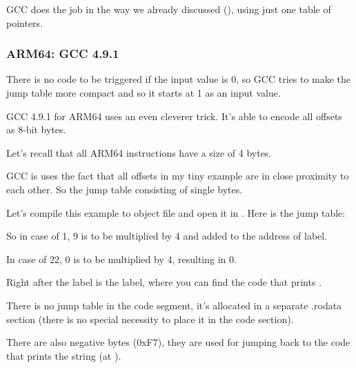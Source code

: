 GCC does the job in the way we already discussed (), using just one table of pointers.

\subsubsection{ARM64: \Optimizing GCC 4.9.1}

There is no code to be triggered if the input value is 0, so GCC tries to make the jump table more compact
and so it starts at 1 as an input value.

GCC 4.9.1 for ARM64 uses an even cleverer trick.
It's able to encode all offsets as 8-bit bytes.

Let's recall that all ARM64 instructions have a size of 4 bytes.

GCC is uses the fact that all offsets in my tiny example are in close proximity to each other.
So the jump table consisting of single bytes.



Let's compile this example to object file and open it in \IDA. Here is the jump table:



So in case of 1, 9 is to be multiplied by 4 and added to the address of  label.

In case of 22, 0 is to be multiplied by 4, resulting in 0. 

Right after the  label is the  label, where you can find the code that prints .

There is no jump table in the code segment, it's allocated in a separate .rodata section 
(there is no special necessity to place it in the code section).

There are also negative bytes (0xF7), they are used for jumping back to the code that prints the  string (at ).

